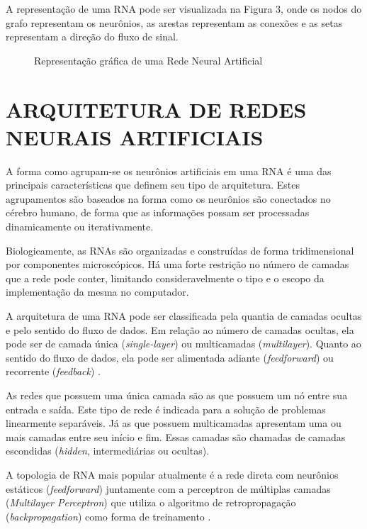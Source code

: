 A representação de uma RNA pode ser visualizada na Figura 3, onde os nodos do grafo representam os neurônios, as arestas representam as conexões e as setas representam a direção do fluxo de sinal.

\begin{figure}[h]
	\centering
	\caption{Representação gráfica de uma Rede Neural Artificial}
	\label{exec-rna}
\end{figure}

\section{ARQUITETURA DE REDES NEURAIS ARTIFICIAIS}\label{sec:redes-neurais-arquitetura}
A forma como agrupam-se os neurônios artificiais em uma RNA é uma das principais características que definem seu tipo de arquitetura. Estes agrupamentos são baseados na forma como os neurônios são conectados no cérebro humano, de forma que as informações possam ser processadas dinamicamente ou iterativamente.
 
Biologicamente, as RNAs são organizadas e construídas de forma tridimensional por componentes microscópicos. Há uma forte restrição no número de camadas que a rede pode conter, limitando consideravelmente o tipo e o escopo da implementação da mesma no computador.

A arquitetura de uma RNA pode ser classificada pela quantia de camadas ocultas e pelo sentido do fluxo de dados. Em relação ao número de camadas ocultas, ela pode ser de camada única (\textit{single-layer}) ou multicamadas (\textit{multilayer}). Quanto ao sentido do fluxo de dados, ela pode ser alimentada adiante (\textit{feedforward}) ou recorrente (\textit{feedback}) \cite{neto}.

As redes que possuem uma única camada são as que possuem um nó entre sua entrada e saída. Este tipo de rede é indicada para a solução de problemas linearmente separáveis. Já as que possuem multicamadas apresentam uma ou mais camadas entre seu início e fim. Essas camadas são chamadas de camadas escondidas (\textit{hidden}, intermediárias ou ocultas).

A topologia de RNA mais popular atualmente é a rede direta com neurônios estáticos (\textit{feedforward}) juntamente com a perceptron de múltiplas camadas (\textit {Multilayer Perceptron}) que utiliza o algoritmo de retropropagação (\textit{backpropagation}) como forma de treinamento \cite{neto}.


